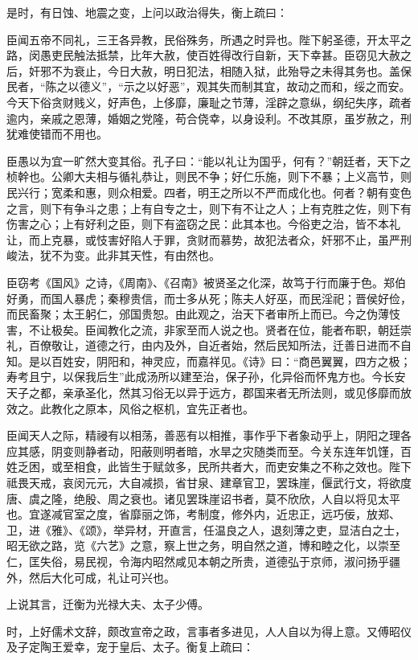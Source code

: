 \documentclass[]{article}
\begin{document}
是时，有日蚀、地震之变，上问以政治得失，衡上疏曰：

臣闻五帝不同礼，三王各异教，民俗殊务，所遇之时异也。陛下躬圣德，开太平之路，闵愚吏民触法抵禁，比年大赦，使百姓得改行自新，天下幸甚。臣窃见大赦之后，奸邪不为衰止，今日大赦，明日犯法，相随入狱，此殆导之未得其务也。盖保民者，``陈之以德义''，``示之以好恶''，观其失而制其宜，故动之而和，绥之而安。今天下俗贪财贱义，好声色，上侈靡，廉耻之节薄，淫辟之意纵，纲纪失序，疏者逾内，亲戚之恩薄，婚姻之党隆，苟合侥幸，以身设利。不改其原，虽岁赦之，刑犹难使错而不用也。

臣愚以为宜一旷然大变其俗。孔子曰：``能以礼让为国乎，何有？''朝廷者，天下之桢幹也。公卿大夫相与循礼恭让，则民不争；好仁乐施，则下不暴；上义高节，则民兴行；宽柔和惠，则众相爱。四者，明王之所以不严而成化也。何者？朝有变色之言，则下有争斗之患；上有自专之士，则下有不让之人；上有克胜之佐，则下有伤害之心；上有好利之臣，则下有盗窃之民：此其本也。今俗吏之治，皆不本礼让，而上克暴，或忮害好陷人于罪，贪财而慕势，故犯法者众，奸邪不止，虽严刑峻法，犹不为变。此非其天性，有由然也。

臣窃考《国风》之诗，《周南》、《召南》被贤圣之化深，故笃于行而廉于色。郑伯好勇，而国人暴虎；秦穆贵信，而士多从死；陈夫人好巫，而民淫祀；晋侯好俭，而民畜聚；太王躬仁，邠国贵恕。由此观之，治天下者审所上而已。今之伪薄忮害，不让极矣。臣闻教化之流，非家至而人说之也。贤者在位，能者布职，朝廷崇礼，百僚敬让，道德之行，由内及外，自近者始，然后民知所法，迁善日进而不自知。是以百姓安，阴阳和，神灵应，而嘉祥见。《诗》曰：``商邑翼翼，四方之极；寿考且宁，以保我后生''此成汤所以建至治，保子孙，化异俗而怀鬼方也。今长安天子之都，亲承圣化，然其习俗无以异于远方，郡国来者无所法则，或见侈靡而放效之。此教化之原本，风俗之枢机，宜先正者也。

臣闻天人之际，精祲有以相荡，善恶有以相推，事作乎下者象动乎上，阴阳之理各应其感，阴变则静者动，阳蔽则明者暗，水旱之灾随类而至。今关东连年饥馑，百姓乏困，或至相食，此皆生于赋敛多，民所共者大，而吏安集之不称之效也。陛下祗畏天戒，哀闵元元，大自减损，省甘泉、建章官卫，罢珠崖，偃武行文，将欲度唐、虞之隆，绝殷、周之衰也。诸见罢珠崖诏书者，莫不欣欣，人自以将见太平也。宜遂减官室之度，省靡丽之饰，考制度，修外内，近忠正，远巧佞，放郑、卫，进《雅》、《颂》，举异材，开直言，任温良之人，退刻薄之吏，显洁白之士，昭无欲之路，览《六艺》之意，察上世之务，明自然之道，博和睦之化，以崇至仁，匡失俗，易民视，令海内昭然咸见本朝之所贵，道德弘于京师，淑问扬乎疆外，然后大化可成，礼让可兴也。

上说其言，迁衡为光禄大夫、太子少傅。

时，上好儒术文辞，颇改宣帝之政，言事者多进见，人人自以为得上意。又傅昭仪及子定陶王爱幸，宠于皇后、太子。衡复上疏曰：
\end{document}
